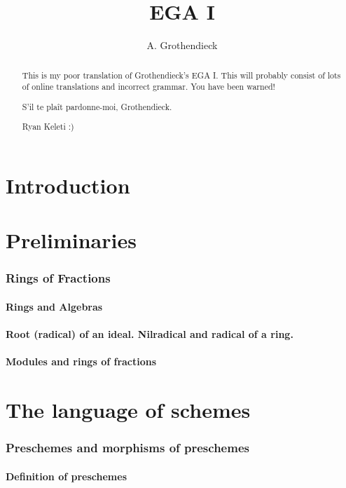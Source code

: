 \documentclass[10pt]{amsart}
\title{EGA I}
\author{A. Grothendieck}
\begin{document}
\renewcommand{\abstractname}{What this is}
\begin{abstract}
    This is my poor translation of Grothendieck's EGA I. This
    will probably consist of lots of online translations and incorrect grammar.
    You have been warned!

    S'il te pla\^it pardonne-moi, Grothendieck.

    Ryan Keleti :)
\end{abstract}

\maketitle

\noindent\hspace{0.15\linewidth}
\begin{minipage}{0.7\linewidth}
    \tableofcontents{}
\end{minipage}


\clearpage


\part*{Introduction}



\clearpage


\setcounter{part}{-1}

\part{Preliminaries}

    \section{Rings of Fractions}

        \subsection{Rings and Algebras}
        

        \subsection{Root (radical) of an ideal. Nilradical and radical of a ring.}
        

        \subsection{Modules and rings of fractions}
        


\clearpage


\part{The language of schemes}

    \section{Preschemes and morphisms of preschemes}

        \subsection{Definition of preschemes}
        
\end{document}
